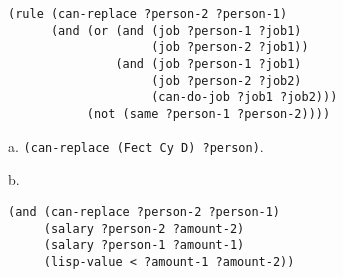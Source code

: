 \documentclass[a4paper,12pt]{article}
\newcommand{\subpar}[1]{\medskip \noindent #1.}
\begin{document}
\begin{lstlisting}
(rule (can-replace ?person-2 ?person-1)
      (and (or (and (job ?person-1 ?job1)
                    (job ?person-2 ?job1))
               (and (job ?person-1 ?job1)
                    (job ?person-2 ?job2)
                    (can-do-job ?job1 ?job2)))
           (not (same ?person-1 ?person-2))))
\end{lstlisting}

\subpar{a} \lstinline!(can-replace (Fect Cy D) ?person)!.

\subpar{b}
\begin{lstlisting}
(and (can-replace ?person-2 ?person-1)
     (salary ?person-2 ?amount-2)
     (salary ?person-1 ?amount-1)
     (lisp-value < ?amount-1 ?amount-2))
\end{lstlisting}
\end{document}
